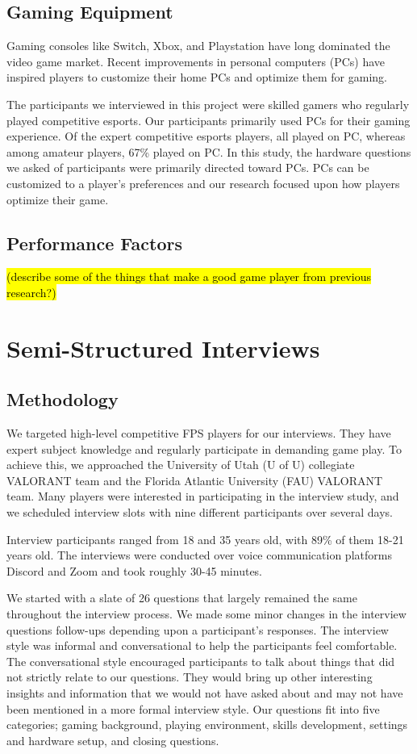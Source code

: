 \documentclass[11pt,manuscript,screen,review]{acmart} %
\begin{document}
\subsection{Gaming Equipment}
Gaming consoles like Switch, Xbox, and Playstation have long dominated the video game market. Recent improvements in personal computers (PCs) have inspired players to customize their home PCs and optimize them for gaming. \cite{hruska2020}

The participants we interviewed in this project were skilled gamers who regularly played competitive esports. Our participants primarily used PCs for their gaming experience. Of the expert competitive esports players, all played on PC, whereas among amateur players, 67\% played on PC. In this study, the hardware questions we asked of participants were primarily directed toward PCs. PCs can be customized to a player's preferences and our research focused upon how players optimize their game.

\subsection{Performance Factors}
\hl{(describe some of the things that make a good game player from previous research?)}

\section{Semi-Structured Interviews}

\subsection{Methodology}
We targeted high-level competitive FPS players for our interviews. They have expert subject knowledge and regularly participate in demanding game play. To achieve this, we approached the University of Utah (U of U) collegiate VALORANT team and the Florida Atlantic University (FAU) VALORANT team. Many players were interested in participating in the interview study, and we scheduled interview slots with nine different participants over several days. 

Interview participants ranged from 18 and 35 years old, with 89\% of them 18-21 years old. The interviews were conducted over voice communication platforms Discord \cite{discord} and Zoom \cite{zoom} and took roughly 30-45 minutes. 

We started with a slate of 26 questions that largely remained the same throughout the interview process. We made some minor changes in the interview questions follow-ups depending upon a participant’s responses. The interview style was informal and conversational to help the participants feel comfortable. The conversational style encouraged participants to talk about things that did not strictly relate to our questions. They would bring up other interesting insights and information that we would not have asked about and may not have been mentioned in a more formal interview style. Our questions fit into five categories; gaming background, playing environment, skills development, settings and hardware setup, and closing questions. 
\end{document}
